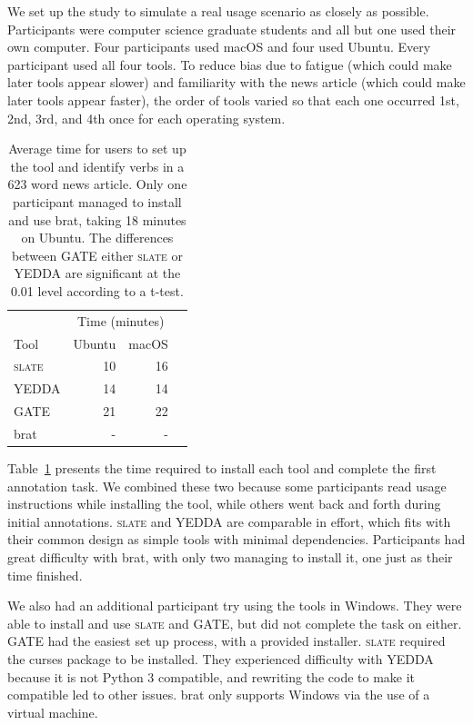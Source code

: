 \documentclass[11pt,a4paper]{article}
\newcommand\slate{\textsc{slate}\xspace}
\begin{document}
We set up the study to simulate a real usage scenario as closely as possible.
Participants were computer science graduate students and all but one used their own computer.
Four participants used macOS and four used Ubuntu.
Every participant used all four tools.
To reduce bias due to fatigue (which could make later tools appear slower) and familiarity with the news article (which could make later tools appear faster), the order of tools varied so that each one occurred 1st, 2nd, 3rd, and 4th once for each operating system.

\begin{table}
  \centering
  \small
  \begin{tabular}{lrrr}
    \toprule
           & \multicolumn{2}{c}{Time (minutes)} \\
    Tool   & Ubuntu & macOS \\
    \midrule
    \slate & 10 & 16 \\
    YEDDA  & 14 & 14 \\
    GATE   & 21 & 22 \\
    brat   &  - &  - \\
    \bottomrule
  \end{tabular}
  \caption{\label{tab:study}
  Average time for users to set up the tool and identify verbs in a 623 word news article.
  Only one participant managed to install and use brat, taking 18 minutes on Ubuntu.
  The differences between GATE either \slate or YEDDA are significant at the 0.01 level according to a t-test.
  }
\end{table}

Table~\ref{tab:study} presents the time required to install each tool and complete the first annotation task.
We combined these two because some participants read usage instructions while installing the tool, while others went back and forth during initial annotations.
\slate and YEDDA are comparable in effort, which fits with their common design as simple tools with minimal dependencies.
Participants had great difficulty with brat, with only two managing to install it, one just as their time finished.

We also had an additional participant try using the tools in Windows.
They were able to install and use \slate and GATE, but did not complete the task on either.
GATE had the easiest set up process, with a provided installer.
\slate required the curses package to be installed.
They experienced difficulty with YEDDA because it is not Python 3 compatible, and rewriting the code to make it compatible led to other issues.
brat only supports Windows via the use of a virtual machine.
\end{document}
